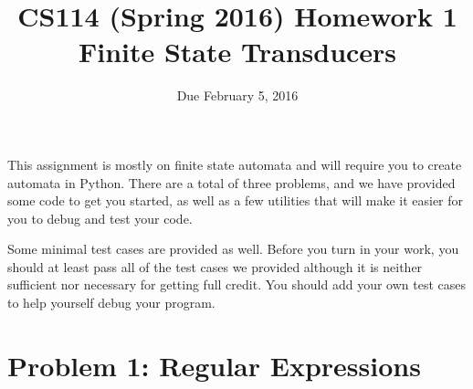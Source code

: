 \documentclass[11pt,letterpaper]{article}
\begin{document}
\title{CS114 (Spring 2016) Homework 1\\Finite State Transducers}
\author{Due February 5, 2016}
\date{}
\maketitle

{}

This assignment is mostly on finite state automata and will require you to
create automata in Python.
There are a total of three problems, and we
have provided some code to get you started, as well as a few utilities
that will make it easier for you to debug and test your code.  

Some minimal test cases are provided as well. 
Before you turn in your work, you should at least pass all of the test cases we provided although it is neither sufficient nor necessary for getting full credit. 
You should add your own test cases to help yourself debug your program.

\section*{Problem 1: Regular Expressions }
\end{document}
